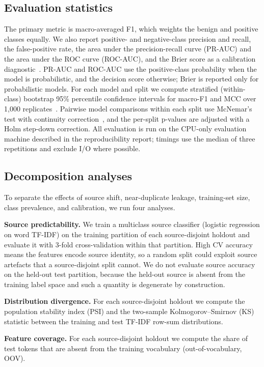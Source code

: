 \documentclass[conference]{IEEEtran}
\begin{document}
\subsection{Evaluation statistics}
The primary metric is macro-averaged F1, which weights the benign and positive classes equally. We also report positive- and negative-class precision and recall, the false-positive rate, the area under the precision-recall curve (PR-AUC) and the area under the ROC curve (ROC-AUC), and the Brier score as a calibration diagnostic~\cite{matthews}. PR-AUC and ROC-AUC use the positive-class probability when the model is probabilistic, and the decision score otherwise; Brier is reported only for probabilistic models. For each model and split we compute stratified (within-class) bootstrap 95\% percentile confidence intervals for macro-F1 and MCC over 1,000 replicates~\cite{efron_tibshirani}. Pairwise model comparisons within each split use McNemar's test with continuity correction~\cite{mcnemar}, and the per-split p-values are adjusted with a Holm step-down correction. All evaluation is run on the CPU-only evaluation machine described in the reproducibility report; timings use the median of three repetitions and exclude I/O where possible.

\subsection{Decomposition analyses}
To separate the effects of source shift, near-duplicate leakage, training-set size, class prevalence, and calibration, we run four analyses.

\textbf{Source predictability.} We train a multiclass source classifier (logistic regression on word TF-IDF) on the training partition of each source-disjoint holdout and evaluate it with 3-fold cross-validation within that partition. High CV accuracy means the features encode source identity, so a random split could exploit source artefacts that a source-disjoint split cannot. We do not evaluate source accuracy on the held-out test partition, because the held-out source is absent from the training label space and such a quantity is degenerate by construction.

\textbf{Distribution divergence.} For each source-disjoint holdout we compute the population stability index (PSI) and the two-sample Kolmogorov--Smirnov (KS) statistic between the training and test TF-IDF row-sum distributions.

\textbf{Feature coverage.} For each source-disjoint holdout we compute the share of test tokens that are absent from the training vocabulary (out-of-vocabulary, OOV).
\end{document}
